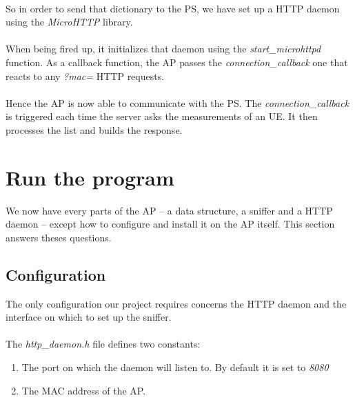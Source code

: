 \paragraph{}
So in order to send that dictionary to the PS, we have set up a HTTP daemon
using the \emph{MicroHTTP} library.

\paragraph{}
When being fired up, it initializes that daemon using the
\emph{start\_microhttpd} function. As a callback function, the AP passes the
\emph{connection\_callback} one that reacts to any \emph{?mac=} HTTP requests.

\paragraph{}
Hence the AP is now able to communicate with the PS. The
\emph{connection\_callback} is triggered each time the server asks the
measurements of an UE. It then processes the list and builds the response.

\section{Run the program}

We now have every parts of the AP -- a data structure, a sniffer and a HTTP
daemon -- except how to configure and install it on the AP itself. This section
answers theses questions.

\subsection{Configuration}

The only configuration our project requires concerns the HTTP daemon and the
interface on which to set up the sniffer.

\paragraph{}
The \emph{http\_daemon.h} file defines two constants:

\begin{enumerate}
    \item The port on which the daemon will listen to. By
        default it is set to \emph{8080}
    \item The MAC address of the AP.
\end{enumerate}

